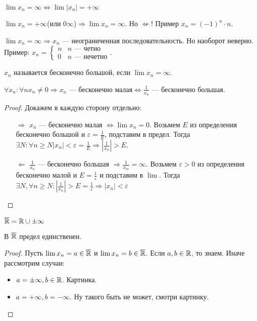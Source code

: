 \begin{remark}
    $\lim x_n = \infty \iff \lim |x_n| = +\infty$
\end{remark}
\begin{remark}
    $\lim x_n = +\infty$(или $0\infty$)$\Rightarrow \lim x_n=\infty$. Но $\not \Leftarrow$! Пример  $x_n = (-1)^n \cdot n$.
\end{remark}
\begin{remark}
    $\lim x_n = \infty \Rightarrow x_n$ --- неограниченная последовательность. Но наоборот неверно. Пример: $x_n = \begin{cases} n & n\text{ --- четно} \\ 0 & n\text{ --- нечетно}\end{cases}$.
\end{remark}
\begin{definition}
    $x_n$ называется бесконечно большой, если  $\lim x_n = \infty$.
\end{definition}
\begin{theorem}
    $\forall x_n: \forall n x_n \neq 0 \Rightarrow x_n\text{ --- бесконечно малая} \iff \frac{1}{x_n}$ --- бесконечно большая.
\end{theorem}
\begin{proof}
    Докажем в каждую сторону отдельно:
    \begin{itemize}
        \item[$\Rightarrow$] $x_n$ --- бесконечно малая  $\iff \lim x_n=0$. Возьмем  $E$ из определения бесконечно большой и  $\varepsilon = \frac{1}{E}$, подставим в предел. Тогда $\exists N: \forall n \ge N|x_n| < \varepsilon = \frac{1}{E} \Rightarrow |\frac{1}{x_n}| > E$.
        \item[$\Leftarrow$] $\frac{1}{x_n}$ --- бесконечно большая $\Rightarrow \frac{1}{x_m} = \infty$. Возьмем $\varepsilon > 0$ из определения бесконечно малой и  $E = \frac{1}{\varepsilon}$ и подставим в $\lim$. Тогда $\exists N, \forall n \ge N: |\frac{1}{x_n}| >E=\frac{1}{\varepsilon} \Rightarrow |x_n| < \varepsilon$
    \end{itemize}
\end{proof}
\begin{definition}
    $\overline{\mathbb{R}} = \mathbb{R} \cup {\pm \infty}$
\end{definition}
\begin{theorem}
    В $\overline{\mathbb{R}}$ предел единственен.
\end{theorem}
\begin{proof}
    Пусть $\lim x_n = a \in \overline{\mathbb{R}}$ и  $\lim x_n = b \in \overline{\mathbb{R}}$. Если  $a, b \in \mathbb{R}$, то знаем. Иначе рассмотрим случаи:
     \begin{itemize}
         \item $a = \pm \infty, b \in \mathbb{R}$. Картинка.
         \item  $a = +\infty, b = -\infty$. Ну такого быть не может, смотри картинку.
    \end{itemize}
\end{proof}
